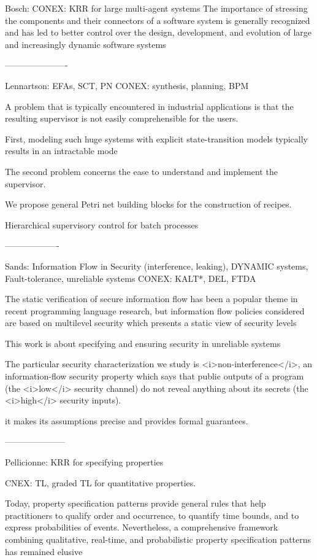 \documentclass[a4paper]{article}
\begin{document}
Bosch: 
CONEX: KRR for large multi-agent systems
The importance of
stressing the components and their connectors of a software
system is generally recognized and has led to better control
over the design, development, and evolution of large and
increasingly dynamic software systems

----------------------

Lennartson: EFAs, SCT, PN
CONEX: synthesis, planning, BPM

A problem that is typically encountered in industrial applications is that the resulting supervisor is not easily comprehensible for the users.

First, modeling such huge systems with explicit state-transition models typically results in an intractable mode

The second problem concerns the ease to understand and implement the supervisor.

We propose general Petri net building blocks for the construction of recipes.

Hierarchical supervisory control for batch processes

-------------------


Sands: Information Flow in Security (interference, leaking), DYNAMIC systems, Fault-tolerance, unreliable systems
CONEX: KALT*, DEL, FTDA

The static verification of secure information flow has been a popular theme in recent programming language research, but information flow policies considered are based on multilevel security which presents a static view of security levels

This work is about specifying and ensuring security in unreliable systems

The particular security characterization we study is <i>non-interference</i>, an information-flow security property which says that public outputs of a program (the <i>low</i> security channel) do not reveal anything about its secrets (the <i>high</i> security inputs). 


it makes its assumptions precise and provides formal guarantees.

---------------------


Pellicionne: KRR for specifying properties

CNEX: TL, graded TL for quantitative properties.

Today, property specification patterns provide general rules that help practitioners to qualify order and occurrence, to quantify time bounds, and to express probabilities of events. Nevertheless, a comprehensive framework combining qualitative, real-time, and probabilistic property specification patterns has remained elusive
\end{document}
